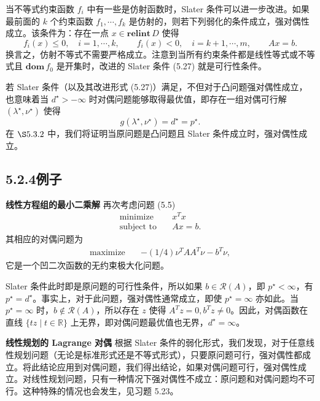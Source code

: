 \documentclass[UTF8, 12pt, fontset=fandol, oneside]{ctexart}
\begin{document}
当不等式约束函数 $f_i$ 中有一些是仿射函数时，Slater 条件可以进一步改进。如果最前面的 $k$ 个约束函数 $f_1,\cdots,f_k$ 是仿射的，则若下列弱化的条件成立，强对偶性成立。该条件为：存在一点 $x\in\mathbf{relint}\,D$ 使得
\begin{equation}
f_i(x)\leq 0,\quad i=1,\cdots,k,\qquad
f_i(x)<0,\quad i=k+1,\cdots,m,\qquad
Ax=b.
\tag{5.27}
\end{equation}
换言之，仿射不等式不需要严格成立。注意到当所有约束条件都是线性等式或不等式且 $\mathbf{dom}\,f_0$ 是开集时，改进的 Slater 条件 (5.27) 就是可行性条件。

若 Slater 条件（以及其改进形式 (5.27)）满足，不但对于凸问题强对偶性成立，也意味着当 $d^\star>-\infty$ 时对偶问题能够取得最优值，即存在一组对偶可行解 $(\lambda^\star,\nu^\star)$ 使得
\[
g(\lambda^\star,\nu^\star)=d^\star=p^\star.
\]
在 $\S 5.3.2$ 中，我们将证明当原问题是凸问题且 Slater 条件成立时，强对偶性成立。

\subsection*{5.2.4\quad 例子}

\noindent\textbf{线性方程组的最小二乘解}\quad
再次考虑问题 (5.5)
\[
\begin{aligned}
\text{minimize}\quad & x^T x\\
\text{subject to}\quad & Ax=b.
\end{aligned}
\]
其相应的对偶问题为
\[
\begin{aligned}
\text{maximize}\quad & -(1/4)\nu^TAA^T\nu-b^T\nu,
\end{aligned}
\]
它是一个凹二次函数的无约束极大化问题。

Slater 条件此时即是原问题的可行性条件，所以如果 $b\in\mathcal{R}(A)$，即 $p^\star<\infty$，有 $p^\star=d^\star$。事实上，对于此问题，强对偶性通常成立，即使 $p^\star=\infty$ 亦如此。当 $p^\star=\infty$ 时，$b\notin\mathcal{R}(A)$，所以存在 $z$ 使得 $A^Tz=0,b^Tz\neq 0$。因此，对偶函数在直线 $\{tz\mid t\in\mathbb{R}\}$ 上无界，即对偶问题最优值也无界，$d^\star=\infty$。

\noindent\textbf{线性规划的 Lagrange 对偶}\quad
根据 Slater 条件的弱化形式，我们发现，对于任意线性规划问题（无论是标准形式还是不等式形式），只要原问题可行，强对偶性都成立。将此结论应用到对偶问题，我们得出结论，如果对偶问题可行，强对偶性成立。对线性规划问题，只有一种情况下强对偶性不成立：原问题和对偶问题均不可行。这种特殊的情况也会发生，见习题 5.23。
\end{document}
